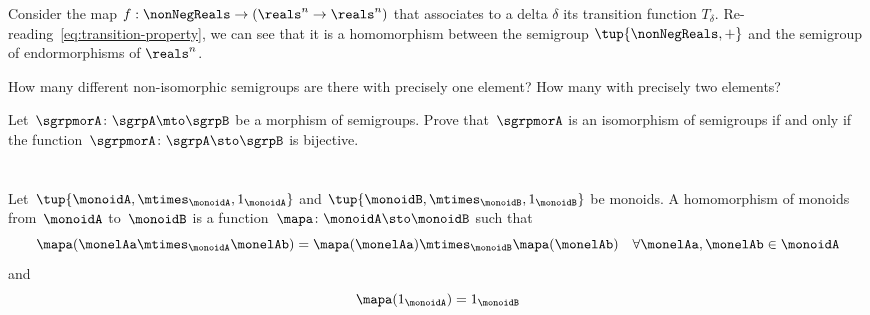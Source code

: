 \begin{example}
  Consider the map $f: \nonNegReals \to (\reals^n \to \reals^n)$ that associates to a delta $\delta$
  its transition function $T_\delta$.
  Re-reading~\cref{eq:transition-property}, we can see that it is a homomorphism between the semigroup $\tup{\nonNegReals,+}$ and the semigroup of endormorphisms of $\reals^n$.
\end{example}




\begin{exercise}
  \label{ex:non-isomorphic}
  How many different non-isomorphic semigroups are there with precisely one element?
  How many with precisely two elements?
\end{exercise}
\begin{solution}
\end{solution}

\begin{exercise}
  \label{ex:semi-morph}
  Let~$\sgrpmorA\colon \sgrpA \mto \sgrpB$ be a morphism of semigroups.
  Prove that~$\sgrpmorA$ is an isomorphism of semigroups if and only if the function~$\sgrpmorA\colon \sgrpA \sto \sgrpB$ is bijective.
\end{exercise}
\begin{solution}
\end{solution}


\section{}

\begin{definition}
  \label{def:monoid-mor}
  Let~$\tup{\monoidA, \mtimes_\monoidA, 1_\monoidA}$ and $\tup{\monoidB, \mtimes_\monoidB, 1_\monoidB}$ be monoids.
  A homomorphism of monoids from~$\monoidA$ to~$\monoidB$ is a function~$\mapa \colon \monoidA \sto \monoidB$ such that
  \begin{equation}
    \label{mon-mor-comp}
    \mapa (\monelAa \mtimes_{\monoidA} \monelAb) = \mapa (\monelAa) \mtimes_{\monoidB}  \mapa(\monelAb) \quad \forall \monelAa, \monelAb \in \monoidA
  \end{equation}
  and
  \begin{equation}
    \label{mon-id-comp}
    \mapa (1_\monoidA) = 1_{\monoidB}
  \end{equation}
\end{definition}

